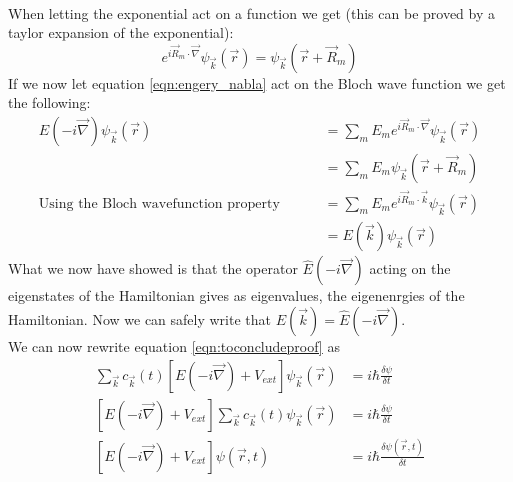 \begin{myproof}
\begin{align}
	\end{align}
	When letting the exponential act on a function we get (this can be proved by a taylor expansion of the exponential):
	\begin{equation}
		e^{i\vec{R}_m\cdot\vec{\nabla}}\psi_{\vec{k}}(\vec{r}) = \psi_{\vec{k}}(\vec{r} + \vec{R}_m)
	\end{equation}
	If we now let equation \ref{eqn:engery_nabla} act on the Bloch wave function we get the following:
	\begin{align}
		\hat{E}(-i\vec{\nabla})\psi_{\vec{k}}(\vec{r}) &= \sum_m^{}E_me^{i\vec{R}_m\cdot\vec{\nabla}}\psi_{\vec{k}}(\vec{r}) \\
		&= \sum_m^{}E_m\psi_{\vec{k}}(\vec{r} + \vec{R}_m) \\
		\text{Using the Bloch wavefunction property }	\qquad &= \sum_m^{}E_me^{i\vec{R}_m\cdot\vec{k}}\psi_{\vec{k}}(\vec{r}) \\
		&= E(\vec{k})\psi_{\vec{k}}(\vec{r})
	\end{align}
	What we now have showed is that the operator $\hat{E}(-i\vec{\nabla})$ acting on the eigenstates of the Hamiltonian gives as eigenvalues, the eigenenrgies of the Hamiltonian. Now we can safely write that $E(\vec{k}) = \hat{E}(-i\vec{\nabla})$. \\
	We can now rewrite equation \ref{eqn:toconcludeproof} as
	\begin{align}
		\sum_{\vec{k}}^{} c_{\vec{k}}(t)\left[E(-i\vec{\nabla}) + V_{ext}\right]\psi_{\vec{k}}(\vec{r}) &= i\hbar\frac{\delta \psi}{\delta t} \\
		\left[E(-i\vec{\nabla}) + V_{ext}\right]\sum_{\vec{k}}^{} c_{\vec{k}}(t)\psi_{\vec{k}}(\vec{r}) &= i\hbar\frac{\delta \psi}{\delta t} \\
		\left[E(-i\vec{\nabla}) + V_{ext}\right]\psi(\vec{r}, t) &= i\hbar\frac{\delta \psi(\vec{r}, t)}{\delta t}
	\end{align}
\end{myproof}
